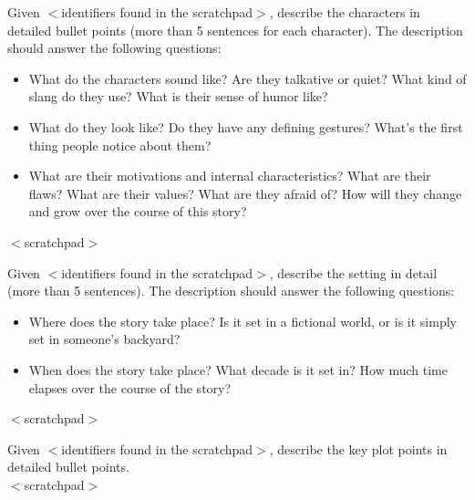 \documentclass{article}
\begin{document}
\begin{tcolorbox}[colback=white, colframe=my-blue, coltitle=black, parskip=5mm, title=
\textbf{\textsc{[Character]} Agent Prompt}, breakable]
Given 
$<$identifiers found in the scratchpad$>$,
        describe the characters in detailed bullet points (more than 5
         sentences for each character). The description should answer the
        following questions:
        \begin{itemize}
            \item[{$\star$}] What do the characters sound like? Are they
         talkative or quiet? What kind of slang do they use? What is their
         sense of humor like?
         \item[{$\star$}] What do they look like? Do they have any
         defining gestures? What's the first thing people notice about
         them?
         \item[{$\star$}] What are their motivations and internal characteristics?
         What are their flaws? What are their values? What are they afraid of?
         How will they change and grow over the course of this story?
         \end{itemize}
$<$scratchpad$>$
\end{tcolorbox}

\begin{tcolorbox}[colback=white, colframe=my-blue, coltitle=black, parskip=5mm, title=
\textbf{\textsc{[Setting]} Agent Prompt}, breakable]
Given  
$<$identifiers found in the scratchpad$>$, 
         describe the setting in detail (more than 5 sentences). The
         description should answer the following questions:
         
         \begin{itemize}
             \item[{$\star$}] Where does the
         story take place? Is it set in a fictional world, or is it simply set
         in someone's backyard?
        \item[{$\star$}] When does the story take place? What decade
         is it set in? How much time elapses over the course of the story?
         \end{itemize}
$<$scratchpad$>$
\end{tcolorbox}

\begin{tcolorbox}[colback=white, colframe=my-blue, coltitle=black, parskip=5mm, title=
\textbf{\textsc{[Plot]} Agent Prompt}, breakable, halign=flush left]
Given 
$<$identifiers found in the scratchpad$>$,
         describe the key plot points in detailed bullet points.
\medskip
\\
$<$scratchpad$>$
\end{tcolorbox}
\end{document}
